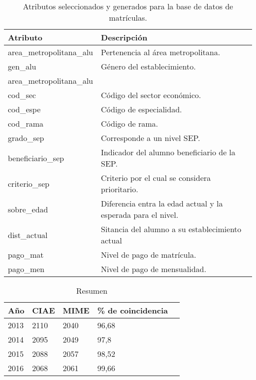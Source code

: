 \begin{table}[]
\centering
\caption{Atributos seleccionados y generados para la base de datos de matrículas.}
\label{my-label}
\begin{tabular}{|p{5cm}|p{9	cm}|}
\hline
\textbf{Atributo}  & \textbf{Descripción} \\ \hline
area\_metropolitana\_alu & Pertenencia al área metropolitana.\\ \hline
gen\_alu & Género del establecimiento. \\ \hline
area\_metropolitana\_alu & \\ \hline
cod\_sec & Código del sector económico.\\ \hline
cod\_espe & Código de especialidad. \\ \hline
cod\_rama & Código de rama. \\ \hline
grado\_sep & Corresponde a un nivel SEP.\\ \hline
beneficiario\_sep & Indicador del alumno beneficiario de la SEP.\\ \hline
criterio\_sep & Criterio por el cual se considera prioritario. \\ \hline
sobre\_edad & Diferencia entra la edad actual y la esperada para el nivel. \\ \hline
dist\_actual & Sitancia del alumno a su establecimiento actual\\ \hline
pago\_mat & Nivel de pago de matrícula. \\ \hline
pago\_men & Nivel de pago de mensualidad. \\ \hline
\end{tabular}
\end{table}



\begin{table}[]
\centering
\caption{Resumen }
\label{my-label}
\begin{tabular}{|l|l|l|l|l|}
\hline
Año  & CIAE & MIME & \% de coincidencia   \\ \hline
2013 & 2110 & 2040 & 96,68 \\ \hline
2014 & 2095 & 2049 & 97,8  \\ \hline
2015 & 2088 & 2057 & 98,52 \\ \hline
2016 & 2068 & 2061 & 99,66 \\ \hline
\end{tabular}
\end{table}